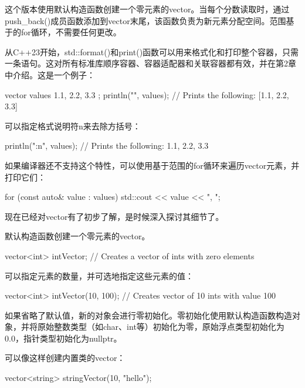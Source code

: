 这个版本使用默认构造函数创建一个零元素的vector。当每个分数读取时，通过push\_back()成员函数添加到vector末尾，该函数负责为新元素分配空间。范围基于的for循环，不需要任何更改。



从C++23开始，std::format()和print()函数可以用来格式化和打印整个容器，只需一条语句。这对所有标准库顺序容器、容器适配器和关联容器都有效，并在第2章中介绍。这是一个例子：

\begin{cpp}
vector values { 1.1, 2.2, 3.3 };
println("{}", values); // Prints the following: [1.1, 2.2, 3.3]
\end{cpp}

可以指定格式说明符n来去除方括号：

\begin{cpp}
println("{:n}", values); // Prints the following: 1.1, 2.2, 3.3
\end{cpp}

如果编译器还不支持这个特性，可以使用基于范围的for循环来遍历vector元素，并打印它们：

\begin{cpp}
for (const auto& value : values) { std::cout << value << ", "; }
\end{cpp}



现在已经对vector有了初步了解，是时候深入探讨其细节了。


默认构造函数创建一个零元素的vector。

\begin{cpp}
vector<int> intVector; // Creates a vector of ints with zero elements
\end{cpp}

可以指定元素的数量，并可选地指定这些元素的值：

\begin{cpp}
vector<int> intVector(10, 100); // Creates vector of 10 ints with value 100
\end{cpp}

如果省略了默认值，新的对象会进行零初始化。零初始化使用默认构造函数构造对象，并将原始整数类型（如char、int等）初始化为零，原始浮点类型初始化为0.0，指针类型初始化为nullptr。

可以像这样创建内置类的vector：

\begin{cpp}
vector<string> stringVector(10, "hello");
\end{cpp}


